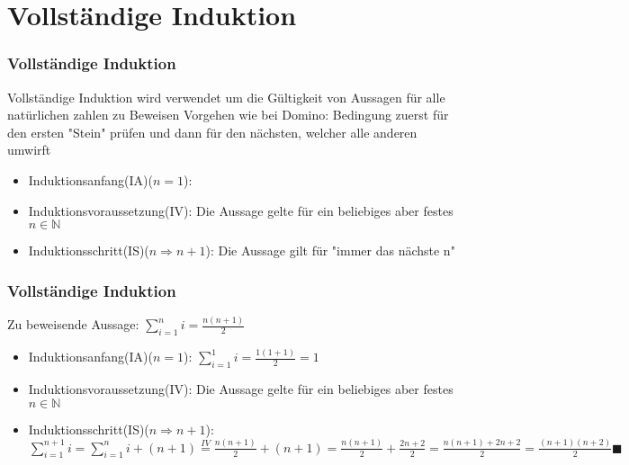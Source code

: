 \section{Vollständige Induktion}
\begin{frame}
    \frametitle{Vollständige Induktion}
    Vollständige Induktion wird verwendet um die Gültigkeit von Aussagen für alle natürlichen zahlen zu Beweisen
    \vfill
     Vorgehen wie bei Domino:
        \newline Bedingung zuerst für den ersten "Stein" prüfen und dann für den nächsten, welcher alle anderen umwirft
    \begin{itemize}
        
        \vfill \item Induktionsanfang(IA)($n=1$):
        \vfill \item Induktionsvoraussetzung(IV):
                \newline Die Aussage gelte für ein beliebiges aber festes $n \in \mathbb{N}$
        \vfill \item Induktionsschritt(IS)($n \Rightarrow n+1$):
        \newline Die Aussage gilt für "immer das nächste n"

    \end{itemize}
\end{frame}

\begin{frame}
    \frametitle{Vollständige Induktion}
    Zu beweisende Aussage: $\sum_{i=1}^{n} i = \frac{n(n+1)}{2}$
    \vfill
    \begin{itemize}
        \vfill \item Induktionsanfang(IA)($n=1$):
                \newline $\sum_{i=1}^{1} i = \frac{1(1+1)}{2} = 1$
        \vfill \item Induktionsvoraussetzung(IV):
                \newline Die Aussage gelte für ein beliebiges aber festes $n \in \mathbb{N}$
        \vfill \item Induktionsschritt(IS)($n \Rightarrow n+1$):
                \newline $\sum_{i=1}^{n+1} i = \sum_{i=1}^{n} i + (n+1) \stackrel{IV}{=} \frac{n(n+1)}{2} + (n+1) = \frac{n(n+1)}{2} + \frac{2n+2}{2} = \frac{n(n+1)+2n+2}{2} = \frac{(n+1)(n+2)}{2} \blacksquare$

    \end{itemize}
\end{frame}

